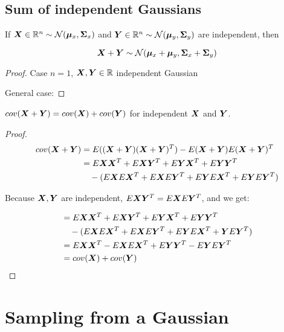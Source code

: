 \begin{tcolorbox}

    \section{Sum of independent Gaussians}
    
    If ${\bm{X}} \in {\mathbb{R}}^n \sim {\mathcal{N}}({\bm{\mu}}_x, {\bm{\Sigma}}_x)$ and ${\bm{Y}} \in {\mathbb{R}}^n \sim {\mathcal{N}}({\bm{\mu}}_y, {\bm{\Sigma}}_y)$ are independent, then
    
    \begin{equation}
        {\bm{X}} + {\bm{Y}} \sim {\mathcal{N}}({\bm{\mu}}_x + {\bm{\mu}}_y, {\bm{\Sigma}}_x + {\bm{\Sigma}}_y)
    \end{equation}
    
    \begin{proof}
    Case $n=1$, ${\bm{X}}, {\bm{Y}} \in {\mathbb{R}}$ independent Gaussian
    
    General case:
    \end{proof}
    
    \begin{thm}
    $cov({\bm{X}} + {\bm{Y}}) = cov({\bm{X}}) + cov({\bm{Y}})$ for independent ${\bm{X}}$ and ${\bm{Y}}$.
    \end{thm}
    
    \begin{proof}
    \begin{align}
        cov({\bm{X}} + {\bm{Y}}) &= E(({\bm{X}} + {\bm{Y}}) ({\bm{X}} + {\bm{Y}})^T) - E({\bm{X}} + {\bm{Y}})E({\bm{X}} + {\bm{Y}})^T \\
        &= E{\bm{X}}{\bm{X}}^T + E{\bm{X}}{\bm{Y}}^T + E{\bm{Y}}{\bm{X}}^T + E{\bm{Y}}{\bm{Y}}^T \\
          &\quad - (E{\bm{X}} E{\bm{X}}^T + E{\bm{X}} E{\bm{Y}}^T + E{\bm{Y}} E{\bm{X}}^T + E {\bm{Y}} E{\bm{Y}}^T)
    \end{align}
    
    Because ${\bm{X}}, {\bm{Y}}$ are independent, $E {\bm{X}} {\bm{Y}}^T = E {\bm{X}} E {\bm{Y}}^T$, and we get:
    
    \begin{align}
        &= E{\bm{X}}{\bm{X}}^T + E{\bm{X}} {\bm{Y}}^T + E{\bm{Y}}{\bm{X}}^T + E{\bm{Y}}{\bm{Y}}^T \\
          &\quad - (E{\bm{X}} E{\bm{X}}^T + E{\bm{X}} E{\bm{Y}}^T + E{\bm{Y}} E{\bm{X}}^T + {\bm{Y}} E{\bm{Y}}^T) \\
        &= E{\bm{X}}{\bm{X}}^T - E{\bm{X}} E{\bm{X}}^T + E{\bm{Y}} {\bm{Y}}^T - E{\bm{Y}} E{\bm{Y}}^T \\
        &= cov({\bm{X}}) + cov({\bm{Y}})
    \end{align}
    \end{proof}
\end{tcolorbox}


\section{Sampling from a Gaussian}


